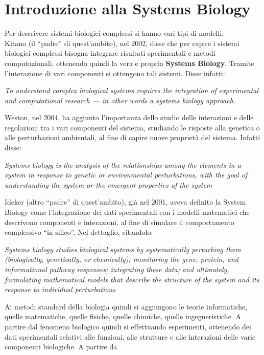 \documentclass[a4paper,12pt, oneside]{book}
\begin{document}
\chapter{Introduzione alla Systems Biology}
Per descrivere sistemi biologici complessi si hanno vari tipi di modelli.\\
Kitano (il ``padre'' di quest'ambito), nel 2002, disse che per capire i sistemi
biologici complessi bisogna integrare risultati sperimentali e metodi
computazionali, ottenendo quindi la 
vera e propria \textbf{Systems Biology}. Tramite l'interazione di vari
componenti si ottengono tali sistemi. Disse infatti:
\begin{center}
  \textit{To understand complex biological systems requires the integration of
    experimental and computational research — in other words a systems biology
    approach.} 
\end{center}
Weston, nel 2004, ha aggiunto l'importanza dello studio delle interazioni e
delle regolazioni tra i vari componenti del sistema, studiando le risposte alla
genetica o alle perturbazioni ambientali, al fine di capire nuove proprietà del
sistema. Infatti disse:
\begin{center}
  \textit{Systems biology is the analysis of the relationships among the
    elements in a system in response to genetic or environmental perturbations,
    with the goal of understanding the system or the emergent properties of the
    system} 
\end{center}
Ideker (altro ``padre'' di quest'ambito), già nel 2001, aveva definito la System
Biology come l'integrazione dei 
dati sperimentali con i modelli matematici che descrivono componenti e
interazioni, al fine di simulare il comportamento complessivo ``in silico''. Nel
dettaglio, citandolo:
\begin{center}
  \textit{Systems biology studies biological systems by systematically
    perturbing them (biologically, genetically, or chemically); monitoring the
    gene, protein, and informational pathway responses; integrating these data;
    and ultimately, formulating mathematical models that describe the structure
    of the system and its response to individual perturbations} 
\end{center}
Ai metodi standard della biologia quindi si aggiungono le teorie
informatiche, quelle matematiche, quelle fisiche, quelle chimiche, quelle
ingegneristiche. A partire dal fenomeno biologico quindi si effettuando
esperimenti, ottenendo dei dati sperimentali relativi alle funzioni, alle
strutture e alle interazioni delle varie componenti biologiche. A partire da
\end{document}
